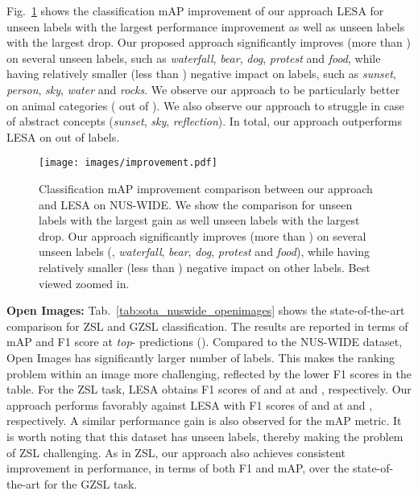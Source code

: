 \documentclass[final]{cvpr}
\begin{document}
Fig.~\ref{fig:nuswide_compare} shows the classification mAP improvement of our approach \wrt LESA for  unseen labels with the largest
performance improvement as well as  unseen labels with the largest drop. Our proposed approach significantly improves (more than ) on several unseen labels, such as \textit{waterfall}, \textit{bear}, \textit{dog}, \textit{protest} and \textit{food}, while having relatively smaller (less than ) negative impact on labels, such as \textit{sunset}, \textit{person}, \textit{sky}, \textit{water} and \textit{rocks}. We observe our approach to be particularly better on animal categories ( out of ). We also observe our approach to struggle in case of abstract concepts (\eg \textit{sunset}, \textit{sky}, \textit{reflection}). In total, our approach outperforms LESA on  out of  labels.

\begin{figure}[t]
\centering
\texttt{[image: images/improvement.pdf]}
\vspace{-0.3cm}
\caption{Classification mAP improvement comparison between our approach and LESA on NUS-WIDE. We show the comparison for  unseen labels with the largest gain as well  unseen labels with the largest drop. Our approach significantly improves (more than ) on several unseen labels (\eg, \textit{waterfall}, \textit{bear}, \textit{dog}, \textit{protest} and \textit{food}), while having relatively smaller (less than ) negative impact on other labels. Best viewed zoomed in.\vspace{-0.35cm}}
\label{fig:nuswide_compare}
\end{figure}

\noindent\textbf{Open Images:} Tab.~\ref{tab:sota_nuswide_openimages} shows the state-of-the-art comparison for ZSL and GZSL classification. The results are reported in terms of mAP and F1 score at \textit{top}- predictions (). Compared to the NUS-WIDE dataset, Open Images has significantly larger number of labels. This makes the ranking problem within an image more challenging, reflected by the lower F1 scores in the table. For the ZSL task, LESA obtains F1 scores of  and  at  and , respectively. Our approach performs favorably against LESA with F1 scores of  and  at  and , respectively. A similar performance gain is also observed for the mAP metric.
It is worth noting that this dataset has  unseen labels, thereby making the problem of ZSL challenging. As in ZSL, our approach also achieves consistent improvement in performance, in terms of both F1 and mAP, over the state-of-the-art for the GZSL task. 
\end{document}
